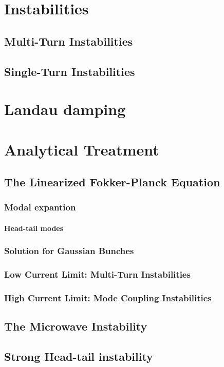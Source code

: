 \section{Instabilities}
\subsection{Multi-Turn Instabilities}
\subsection{Single-Turn Instabilities}
\section{Landau damping}
\section{Analytical Treatment}
\subsection{The Linearized Fokker-Planck Equation}
\subsubsection{Modal expantion}
\paragraph{Head-tail modes}
\subsubsection{Solution for Gaussian Bunches}
\subsubsection{Low Current Limit: Multi-Turn Instabilities}
\subsubsection{High Current Limit: Mode Coupling Instabilities}
\subsection{The Microwave Instability}
\subsection{Strong Head-tail instability}


